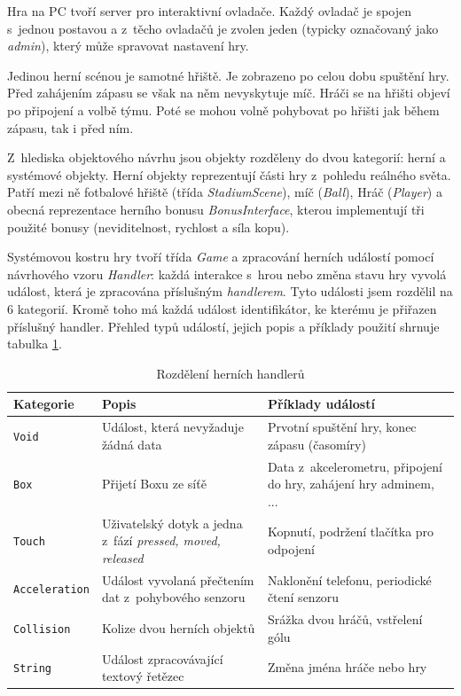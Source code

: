 \documentclass[thesis=B,czech,hidelinks]{FITthesis}[2012/06/26] %
\newcommand{\code}[1]{\texttt{#1}}
\begin{document}

Hra na PC tvoří server pro interaktivní ovladače. Každý ovladač je spojen s~jednou postavou a z~těcho ovladačů je zvolen jeden (typicky označovaný jako \textit{admin}), který může spravovat nastavení hry.

Jedinou herní scénou je samotné hřiště. Je zobrazeno po celou dobu spuštění hry. Před zahájením zápasu se však na něm nevyskytuje míč. Hráči se na hřišti objeví po připojení a volbě týmu. Poté se mohou volně pohybovat po hřišti jak během zápasu, tak i před ním. 

Z~hlediska objektového návrhu jsou objekty rozděleny do dvou kategorií: herní a systémové objekty. Herní objekty reprezentují části hry z~pohledu reálného světa. Patří mezi ně fotbalové hřiště (třída \textit{StadiumScene}), míč (\textit{Ball}), Hráč (\textit{Player}) a obecná reprezentace herního bonusu \textit{BonusInterface}, kterou implementují tři použité bonusy (neviditelnost, rychlost a síla kopu). 

Systémovou kostru hry tvoří třída \textit{Game} a zpracování herních událostí pomocí návrhového vzoru \textit{Handler}\cite{patterns}: každá interakce s~hrou nebo změna stavu hry vyvolá událost, která je zpracována příslušným \textit{handlerem}. Tyto události jsem rozdělil na 6 kategorií. Kromě toho má každá událost identifikátor, ke kterému je přiřazen příslušný handler. Přehled typů událostí, jejich popis a příklady použití shrnuje tabulka \ref{table:handlers}.

\begin{table}[h]
\caption{Rozdělení herních handlerů}
\label{table:handlers}
\begin{tabularx}{\textwidth}{|X|X|X|}
\hline
\textbf{Kategorie} & \textbf{Popis} & \textbf{Příklady událostí} \\ \hline
\code{Void} & Událost, která nevyžaduje žádná data & Prvotní spuštění hry, konec zápasu (časomíry) \\ \hline
\code{Box} & Přijetí Boxu ze síťě & Data z~akcelerometru, připojení do hry, zahájení hry adminem, ... \\ \hline
\code{Touch} & Uživatelský dotyk a jedna z~fází \textit{pressed, moved, released} & Kopnutí, podržení tlačítka pro odpojení \\ \hline
\code{Acceleration} & Událost vyvolaná přečtením dat z~pohybového senzoru & Naklonění telefonu, periodické čtení senzoru \\ \hline
\code{Collision} & Kolize dvou herních objektů & Srážka dvou hráčů, vstřelení gólu\\ \hline
\code{String} & Událost zpracovávající textový řetězec & Změna jména hráče nebo hry \\ \hline

\end{tabularx}
\end{table}
\end{document}
